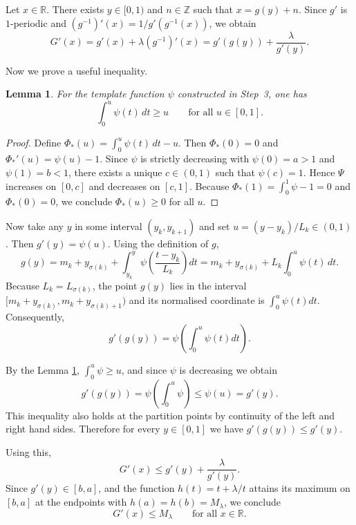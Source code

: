 \documentclass{amsart}
\newtheorem{Lemma}[Definition]{Lemma}
\begin{document}
	Let $x\in\mathbb{R}$. There exists $y\in[0,1)$ and $n\in\mathbb{Z}$ such that $x=g(y)+n$. Since $g'$ is $1$-periodic and $(g^{-1})'(x)=1/g'(g^{-1}(x))$, we obtain
	\[
	G'(x)=g'(x)+\lambda(g^{-1})'(x)=g'(g(y))+\frac{\lambda}{g'(y)}.
	\]
	
	Now we prove a useful inequality.
	
	\begin{Lemma}\label{lemma2}
		For the template function $\psi$ constructed in Step~3, one has
		\begin{equation}
			\int_0^u\psi(t)\,dt\ge u\qquad\text{for all }u\in[0,1].
		\end{equation}
	\end{Lemma}
	
	\begin{proof}
		Define $\Phi_*(u)=\int_0^u\psi(t)\,dt-u$. Then $\Phi_*(0)=0$ and $\Phi_*'(u)=\psi(u)-1$. Since $\psi$ is strictly decreasing with $\psi(0)=a>1$ and $\psi(1)=b<1$, there exists a unique $c\in(0,1)$ such that $\psi(c)=1$. Hence $\Psi$ increases on $[0,c]$ and decreases on $[c,1]$. Because $\Phi_*(1)=\int_0^1\psi-1=0$ and $\Phi_*(0)=0$, we conclude $\Phi_*(u)\ge0$ for all $u$.
	\end{proof}
	
	\vspace{1ex}
	
	Now take any $y$ in some interval $(y_k,y_{k+1})$ and set $u=(y-y_k)/L_k\in(0,1)$. Then $g'(y)=\psi(u)$. Using the definition of $g$,
	\[
	g(y)=m_k+y_{\sigma(k)}+\int_{y_k}^y\psi\!\left(\frac{t-y_k}{L_k}\right)dt
	=m_k+y_{\sigma(k)}+L_k\int_0^u\psi(t)\,dt.
	\]
	Because $L_k=L_{\sigma(k)}$, the point $g(y)$ lies in the interval $[m_k+y_{\sigma(k)},m_k+y_{\sigma(k)+1})$ and its normalised coordinate is $\int_0^u\psi(t)dt$. Consequently,
	\[
	g'(g(y))=\psi\!\left(\int_0^u\psi(t)dt\right).
	\]
	
	By the Lemma \ref{lemma2}, $\int_0^u\psi\ge u$, and since $\psi$ is decreasing we obtain
	\[
	g'(g(y))=\psi\!\left(\int_0^u\psi\right)\le\psi(u)=g'(y).
	\]
	This inequality also holds at the partition points by continuity of the left and right hand sides. Therefore for every $y\in[0,1]$ we have $g'(g(y))\le g'(y)$.
	
	Using this,
	\[
	G'(x)\le g'(y)+\frac{\lambda}{g'(y)}.
	\]
	Since $g'(y)\in[b,a]$, and the function $h(t)=t+\lambda/t$ attains its maximum on $[b,a]$ at the endpoints with $h(a)=h(b)=M_{\lambda}$, we conclude
	\[
	G'(x)\le M_{\lambda}\qquad\text{for all }x\in\mathbb{R}.
	\]
	
\end{document}
